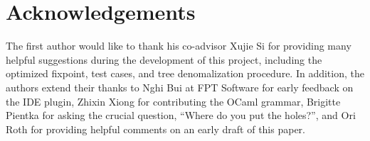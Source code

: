 \documentclass[sigplan,nonacm]{acmart}\settopmatter{printfolios=false,printccs=false,printacmref=false}
\begin{document}

\section{Acknowledgements}
The first author would like to thank his co-advisor Xujie Si for providing many helpful suggestions during the development of this project, including the optimized fixpoint, test cases, and tree denomalization procedure. In addition, the authors extend their thanks to Nghi Bui at FPT Software for early feedback on the IDE plugin, Zhixin Xiong for contributing the OCaml grammar, Brigitte Pientka for asking the crucial question, ``Where do you put the holes?'', and Ori Roth for providing helpful comments on an early draft of this paper.

\end{document}
